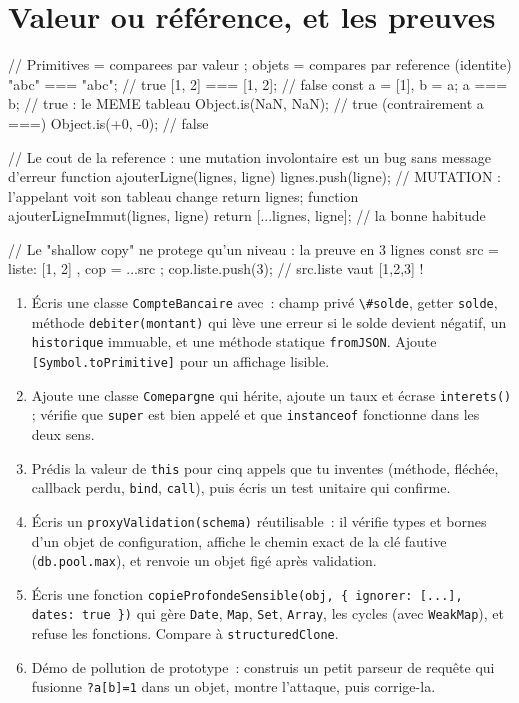 \documentclass[12pt,a4paper,twoside,openright]{book}
\begin{document}
\section{Valeur ou r\'ef\'erence, et les preuves}

\begin{codejs}
// Primitives = comparees par valeur ; objets = compares par reference (identite)
"abc" === "abc";                    // true
[1, 2] === [1, 2];                  // false
const a = [1], b = a; a === b;      // true : le MEME tableau
Object.is(NaN, NaN);                // true (contrairement a ===)
Object.is(+0, -0);                  // false

// Le cout de la reference : une mutation involontaire est un bug sans message d'erreur
function ajouterLigne(lignes, ligne) {
  lignes.push(ligne);               // MUTATION : l'appelant voit son tableau change
  return lignes;
}
function ajouterLigneImmut(lignes, ligne) { return [...lignes, ligne]; }   // la bonne habitude

// Le "shallow copy" ne protege qu'un niveau : la preuve en 3 lignes
const src = { liste: [1, 2] }, cop = { ...src };
cop.liste.push(3);                  // src.liste vaut [1,2,3] !
\end{codejs}

\begin{exercice}
\begin{enumerate}
  \item \'Ecris une classe \verb|CompteBancaire| avec~: champ priv\'e \verb|\#solde|, getter
        \verb|solde|, m\'ethode \verb|debiter(montant)| qui l\`eve une erreur si le solde devient
        n\'egatif, un \verb|historique| immuable, et une m\'ethode statique \verb|fromJSON|.
        Ajoute \verb|[Symbol.toPrimitive]| pour un affichage lisible.
  \item Ajoute une classe \verb|Comepargne| qui h\'erite, ajoute un taux et \'ecrase
        \verb|interets()| ; v\'erifie que \verb|super| est bien appel\'e et que \verb|instanceof|
        fonctionne dans les deux sens.
  \item Pr\'edis la valeur de \verb|this| pour cinq appels que tu inventes (m\'ethode, fl\'ech\'ee,
        callback perdu, \verb|bind|, \verb|call|), puis \'ecris un test unitaire qui confirme.
  \item \'Ecris un \verb|proxyValidation(schema)| r\'eutilisable~: il v\'erifie types et bornes
        d'un objet de configuration, affiche le chemin exact de la cl\'e fautive
        (\verb|db.pool.max|), et renvoie un objet fig\'e apr\`es validation.
  \item \'Ecris une fonction \verb|copieProfondeSensible(obj, { ignorer: [...], dates: true })|
        qui g\`ere \verb|Date|, \verb|Map|, \verb|Set|, \verb|Array|, les cycles
        (avec \verb|WeakMap|), et refuse les fonctions. Compare \`a \verb|structuredClone|.
  \item D\'emo de pollution de prototype~: construis un petit parseur de requ\^ete
        qui fusionne \verb|?a[b]=1| dans un objet, montre l'attaque, puis corrige-la.
\end{enumerate}
\end{exercice}
\end{document}
